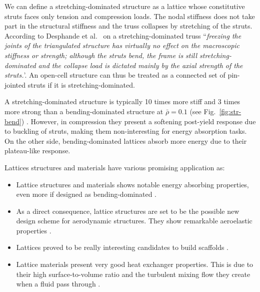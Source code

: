 We can define a stretching-dominated structure as a lattice whose constitutive struts faces only tension and compression loads. The nodal stiffness does not take part in the structural stiffness and the truss collapses by stretching of the struts. According to Desphande et al.~ on a stretching-dominated truss ``\textit{freezing the joints of the triangulated structure has virtually no effect on the macroscopic stiffness or strength; although the struts bend, the frame is still stretching-dominated and the collapse load is dictated mainly by the axial strength of the struts.}'. An open-cell structure can thus be treated as a connected set of pin-jointed struts if it is stretching-dominated.

A stretching-dominated structure is typically 10 times more stiff and 3 times more strong than a bending-dominated structure at $\bar{\rho} = 0.1$ (see Fig.~\ref{fig:str-bend}) \cite{deshpande_foam_2001}. However, in compression they present a softening post-yield response due to buckling of struts, making them non-interesting for energy absorption tasks. On the other side, bending-dominated lattices absorb more energy due to their plateau-like response.


Lattices structures and materials have various promising application as:
\begin{itemize}
    \item Lattice structures and materials shows notable energy absorbing properties, even more if designed as bending-dominated .
    \item As a direct consequence, lattice structures are set to be the possible new design scheme for aerodynamic structures. They show remarkable aeroelastic properties .
    \item Lattices proved to be really interesting candidates to build scaffolds .
    \item Lattice materials present very good heat exchanger properties. This is due to their high surface-to-volume ratio and the turbulent mixing flow they create when a fluid pass through .
\end{itemize}


